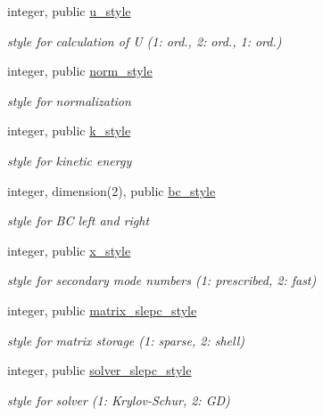 \begin{DoxyCompactItemize}
integer, public \hyperlink{namespacenum__vars_a5b3a837df1e82bb43fc47815c62c6b49}{u\+\_\+style}
\begin{DoxyCompactList}\small\item\em style for calculation of U (1\+: ord., 2\+: ord., 1\+: ord.) \end{DoxyCompactList}\item 
integer, public \hyperlink{namespacenum__vars_acefc971404bce11e23308d5214d96d32}{norm\+\_\+style}
\begin{DoxyCompactList}\small\item\em style for normalization \end{DoxyCompactList}\item 
integer, public \hyperlink{namespacenum__vars_ac53a1bb8d91f2b753690456a340cfd44}{k\+\_\+style}
\begin{DoxyCompactList}\small\item\em style for kinetic energy \end{DoxyCompactList}\item 
integer, dimension(2), public \hyperlink{namespacenum__vars_aabda06d22d0bad62383df3a0d977a82c}{bc\+\_\+style}
\begin{DoxyCompactList}\small\item\em style for BC left and right \end{DoxyCompactList}\item 
integer, public \hyperlink{namespacenum__vars_ad847b8c0cbf1e841c788bd657b40af5f}{x\+\_\+style}
\begin{DoxyCompactList}\small\item\em style for secondary mode numbers (1\+: prescribed, 2\+: fast) \end{DoxyCompactList}\item 
integer, public \hyperlink{namespacenum__vars_addd869f9551067812954f8e24fe078b1}{matrix\+\_\+slepc\+\_\+style}
\begin{DoxyCompactList}\small\item\em style for matrix storage (1\+: sparse, 2\+: shell) \end{DoxyCompactList}\item 
integer, public \hyperlink{namespacenum__vars_aff32519d88708f2f44f80d62cfb0e0f4}{solver\+\_\+slepc\+\_\+style}
\begin{DoxyCompactList}\small\item\em style for solver (1\+: Krylov-\/\+Schur, 2\+: GD) \end{DoxyCompactList}\item 

\end{DoxyCompactItemize}
